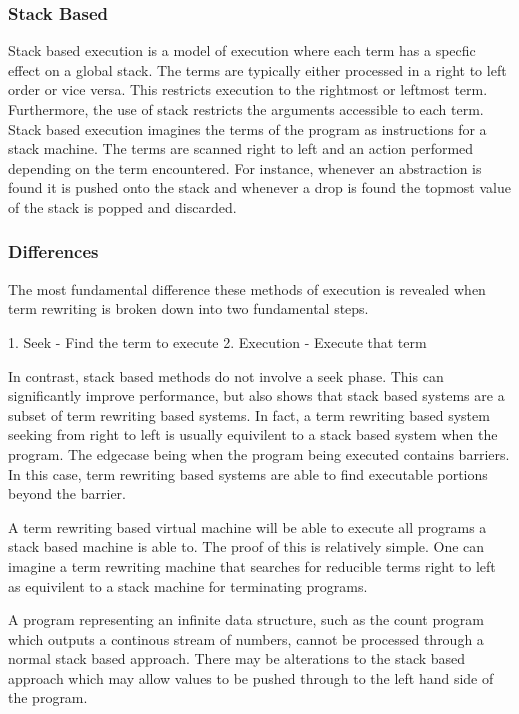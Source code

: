 \subsubsection{Stack Based}
Stack based execution is a model of execution where each term
has a specfic effect on a global stack. The terms are typically
either processed in a right to left order or vice versa. This
restricts execution to the rightmost or leftmost term. Furthermore,
the use of stack restricts the arguments accessible to each term.
Stack based execution imagines the terms of the program as
instructions for a stack machine. The terms are scanned
right to left and an action performed depending on the term
encountered. For instance, whenever an abstraction is found
it is pushed onto the stack and whenever a drop is found the
topmost value of the stack is popped and discarded.

\subsubsection{Differences}
The most fundamental difference these methods of execution is
revealed when term rewriting is broken down into two fundamental steps.

1. Seek
    - Find the term to execute
2. Execution
    - Execute that term

In contrast, stack based methods do not involve a seek phase. This
can significantly improve performance, but also shows that stack
based systems are a subset of term rewriting based systems. In fact,
a term rewriting based system seeking from right to left is usually 
equivilent to a stack based system when the program. The edgecase
being when the program being executed contains barriers. In this case,
term rewriting based systems are able to find executable portions
beyond the barrier.

A term rewriting based virtual machine will be able to execute
all programs a stack based machine is able to. The proof of this
is relatively simple. One can imagine a term rewriting machine 
that searches for reducible terms right to left as equivilent to
a stack machine for terminating programs.



A program representing an infinite data structure, such as the count
program which outputs a continous stream of numbers, cannot be
processed through a normal stack based approach. There may be alterations
to the stack based approach which may allow values to be pushed 
through to the left hand side of the program.


